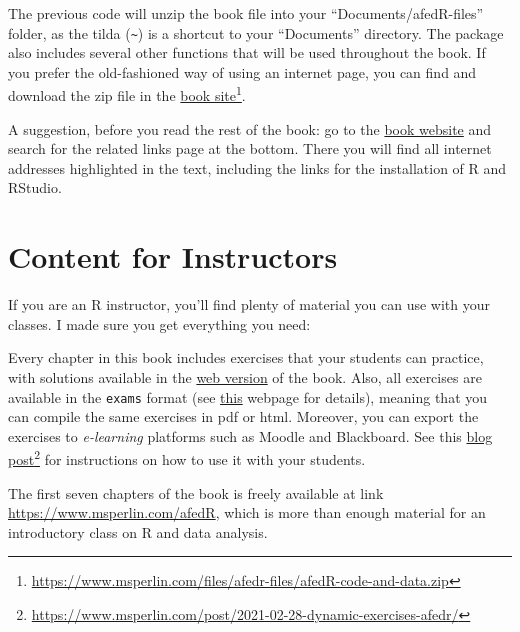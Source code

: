\documentclass[
  12pt,
]{book}
\providecommand{\tightlist}{%
  \setlength{\itemsep}{0pt}\setlength{\parskip}{0pt}}
\begin{document}
The previous code will unzip the book file into your ``Documents/afedR-files'' folder, as the tilda (\texttt{\textasciitilde{}}) is a shortcut to your ``Documents'' directory. The package also includes several other functions that will be used throughout the book. If you prefer the old-fashioned way of using an internet page, you can find and download the zip file in the \href{https://www.msperlin.com/files/afedr-files/afedR-code-and-data.zip}{book site}\footnote{\url{https://www.msperlin.com/files/afedr-files/afedR-code-and-data.zip}}.

A suggestion, before you read the rest of the book: go to the \href{https://www.msperlin.com/publication/2020_book-afedr-en/}{book website} and search for the related links page at the bottom. There you will find all internet addresses highlighted in the text, including the links for the installation of R and RStudio.

\hypertarget{content-for-instructors}{%
\section*{Content for Instructors}\label{content-for-instructors}}

If you are an R instructor, you'll find plenty of material you can use with your classes. I made sure you get everything you need:

\begin{description}
\tightlist
\item[Over 100 exercises]
Every chapter in this book includes exercises that your students can practice, with solutions available in the \href{https://www.msperlin.com/afedR}{web version} of the book. Also, all exercises are available in the \texttt{exams} format (see \href{http://www.r-exams.org/}{this} webpage for details), meaning that you can compile the same exercises in pdf or html. Moreover, you can export the exercises to \emph{e-learning} platforms such as Moodle and Blackboard. See this \href{https://www.msperlin.com/post/2021-02-28-dynamic-exercises-afedr/}{blog post}\footnote{\url{https://www.msperlin.com/post/2021-02-28-dynamic-exercises-afedr/}} for instructions on how to use it with your students.
\item[Web version]
The first seven chapters of the book is freely available at link \url{https://www.msperlin.com/afedR}, which is more than enough material for an introductory class on R and data analysis.
\end{description}
\end{document}
